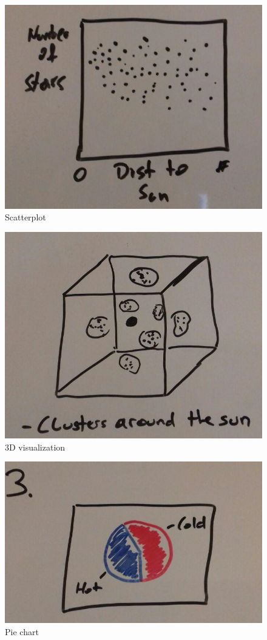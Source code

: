 \documentclass{article}
\begin{document}
\begin{figure}
\includegraphics[width=\textwidth]{NumbStarsDistSun.jpg}
	\caption{Scatterplot}
	\label{fig3}
\end{figure}
\begin{figure}
\includegraphics[width=\textwidth]{ClustersSun3d.jpg}
	\caption{3D visualization}
	\label{fig4}
\end{figure}
\begin{figure}
\includegraphics[width=\textwidth]{HotColdRatio.jpg}
	\caption{Pie chart}
	\label{fig5}
\end{figure}
\end{document}
